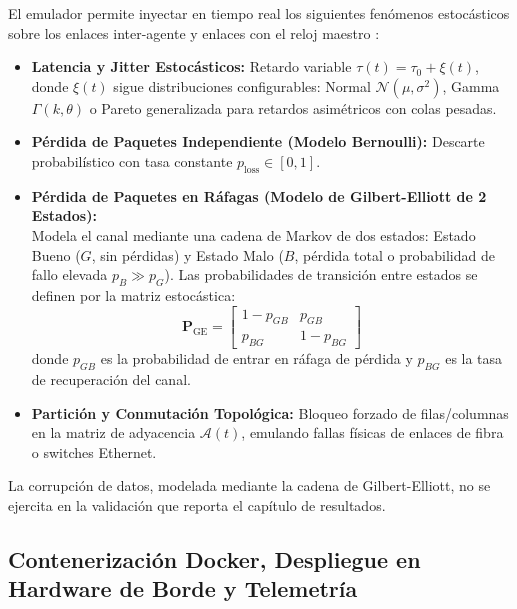 El emulador permite inyectar en tiempo real los siguientes fenómenos estocásticos sobre los enlaces inter-agente y enlaces con el reloj maestro \citep{Sowa2023, Olayanju2025ConsensusFreq}:
\begin{itemize}
    \item \textbf{Latencia y Jitter Estocásticos:} Retardo variable $\tau(t) = \tau_0 + \xi(t)$, donde $\xi(t)$ sigue distribuciones configurables: Normal $\mathcal{N}(\mu, \sigma^2)$, Gamma $\Gamma(k, \theta)$ o Pareto generalizada para retardos asimétricos con colas pesadas.
    \item \textbf{Pérdida de Paquetes Independiente (Modelo Bernoulli):} Descarte probabilístico con tasa constante $p_{\text{loss}} \in [0, 1]$.
    \item \textbf{Pérdida de Paquetes en Ráfagas (Modelo de Gilbert-Elliott de 2 Estados):}\\
    Modela el canal mediante una cadena de Markov de dos estados: Estado Bueno ($G$, sin pérdidas) y Estado Malo ($B$, pérdida total o probabilidad de fallo elevada $p_B \gg p_G$). Las probabilidades de transición entre estados se definen por la matriz estocástica:
    \begin{equation}
    \mathbf{P}_{\text{GE}} = \begin{bmatrix} 1 - p_{GB} & p_{GB} \\ p_{BG} & 1 - p_{BG} \end{bmatrix}
    \end{equation}
    donde $p_{GB}$ es la probabilidad de entrar en ráfaga de pérdida y $p_{BG}$ es la tasa de recuperación del canal.
    \item \textbf{Partición y Conmutación Topológica:} Bloqueo forzado de filas/columnas en la matriz de adyacencia $\mathcal{A}(t)$, emulando fallas físicas de enlaces de fibra o switches Ethernet.
\end{itemize}

La corrupción de datos, modelada mediante la cadena de Gilbert-Elliott, no se ejercita en la validación que reporta el capítulo de resultados.

\subsection{Contenerización Docker, Despliegue en Hardware de Borde y Telemetría}

